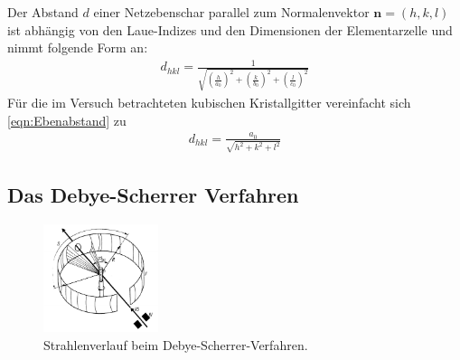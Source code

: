 \documentclass[a4paper,twoside,final]{article}
\begin{document}
Der Abstand $d$ einer Netzebenschar parallel zum Normalenvektor $\bm{n}=(h,k,l)$ ist abhängig von den Laue-Indizes und den Dimensionen der Elementarzelle und nimmt folgende Form an:
\begin{align}
  d_{hkl} = \frac{1}{\sqrt{\left(\frac{h}{a_0}\right)^2+\left(\frac{k}{b_0}\right)^2+\left(\frac{l}{c_0}\right)^2}}\label{eqn:Ebenabstand}
\end{align}
Für die im Versuch betrachteten kubischen Kristallgitter vereinfacht sich \eqref{eqn:Ebenabstand} zu
\begin{align}
  d_{hkl} = \frac{a_0}{\sqrt{h^2+k^2+l^2}}
\end{align}

\subsection{Das Debye-Scherrer Verfahren}
\begin{figure}[htp]
    \centering
    \includegraphics[width=0.3\textwidth]{Abbildungen/Debye-Sherrer-Kamera.pdf}
    \caption{Strahlenverlauf beim Debye-Scherrer-Verfahren.~\cite[S.375]{Kleber}}
    \label{fig:Debye-Kamera}
\end{figure}\\


\end{document}
